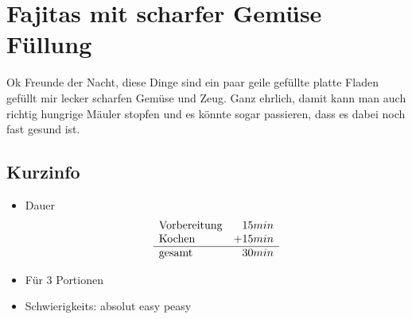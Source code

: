 \section{Fajitas mit scharfer Gemüse Füllung}
  \label{Haupt:Fajitas_mit_scharfer_Gemuese_Fuellung}
  Ok Freunde der Nacht, diese Dinge sind ein paar geile gefüllte platte Fladen
  gefüllt mir lecker scharfen Gemüse und Zeug. Ganz ehrlich, damit kann man auch
  richtig hungrige Mäuler stopfen und es könnte sogar passieren, dass es dabei
  noch fast gesund ist.
  \subsection*{Kurzinfo}
    \begin{itemize}
      \item Dauer
        \begin{displaymath}
          \begin{array}{l r}
            \text{Vorbereitung}& 15min \\
            \text{Kochen}& +15min\\ \hline
            \text{gesamt}& 30min
          \end{array}
        \end{displaymath}
      \item Für 3 Portionen
      \item Schwierigkeits: absolut easy peasy
    \end{itemize}
